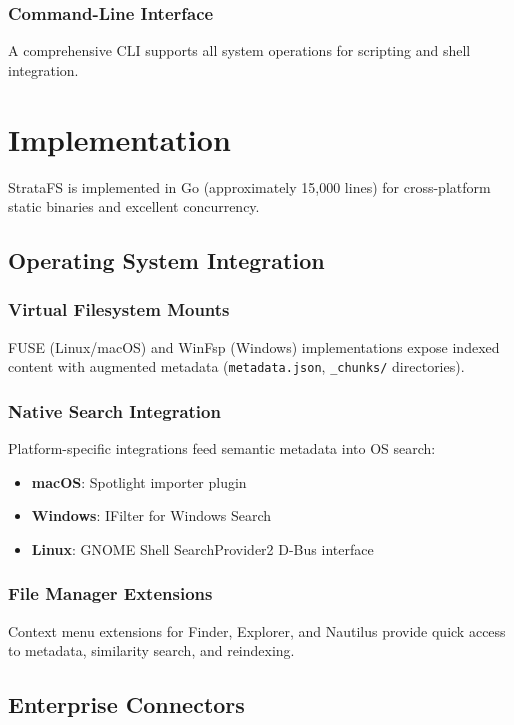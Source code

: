 \documentclass[conference]{IEEEtran}
\begin{document}
\subsubsection{Command-Line Interface}
A comprehensive CLI supports all system operations for scripting and shell integration.

\section{Implementation}

StrataFS is implemented in Go (approximately 15,000 lines) for cross-platform static binaries and excellent concurrency.

\subsection{Operating System Integration}

\subsubsection{Virtual Filesystem Mounts}
FUSE (Linux/macOS) and WinFsp (Windows) implementations expose indexed content with augmented metadata (\texttt{metadata.json}, \texttt{\_chunks/} directories).

\subsubsection{Native Search Integration}
Platform-specific integrations feed semantic metadata into OS search:
\begin{itemize}
    \item \textbf{macOS}: Spotlight importer plugin
    \item \textbf{Windows}: IFilter for Windows Search
    \item \textbf{Linux}: GNOME Shell SearchProvider2 D-Bus interface
\end{itemize}

\subsubsection{File Manager Extensions}
Context menu extensions for Finder, Explorer, and Nautilus provide quick access to metadata, similarity search, and reindexing.

\subsection{Enterprise Connectors}
\end{document}
